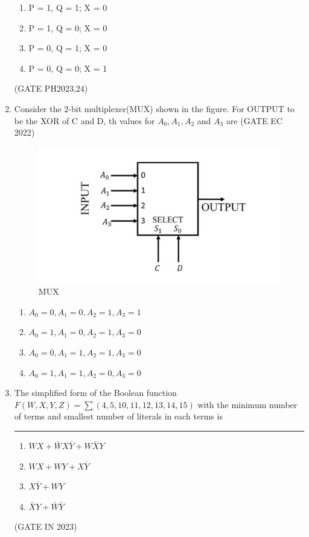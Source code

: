 \begin{enumerate}
\begin{enumerate}[label=(\alph*)]
    \item P = 1, Q = 1; X = 0
    \item P = 1, Q = 0; X = 0
    \item P = 0, Q = 1; X = 0
    \item P = 0, Q = 0; X = 1
\end{enumerate}
\hfill(GATE PH2023,24)

\item

	 Consider the $2$-bit multiplexer(MUX) shown in the figure. For OUTPUT to be the XOR of C and D, th values for $A_0,A_1,A_2$ and $A_3$  are \underline{\hspace{20pt}}  \hfill(GATE EC 2022)
	

	 \begin{figure}[h]
		 \centering
		\includegraphics[width=\columnwidth]{figs/gatepic19.jpg}
		\caption{MUX}
		 \label{fig:MUX}
	\end{figure}
	 \begin{enumerate}[label=(\Alph*)]
		\item $A_0=0,A_1=0,A_2=1,A_3=1$
		\item $A_0=1,A_1=0,A_2=1,A_3=0$
		\item $A_0=0,A_1=1,A_2=1,A_3=0$
		\item $A_0=1,A_1=1,A_2=0,A_3=0$
	\end{enumerate}

 \item The simplified form of the Boolean function $F(W,X,Y,Z)=\sum(4,5,10,11,12,13,14,15)$ with the minimum number of terms and smallest number of literals in each terms is \rule{60pt}{1pt}
	  \begin{enumerate}
		  \item $WX+\bar WX\bar Y+W\bar XY$
		   \item $WX+WY+X\bar Y$
		     \item $X\bar Y+WY$
		      \item$\bar XY+\bar W\bar Y$
	\end{enumerate}
 \hfill{(GATE IN 2023)}


\end{enumerate}
